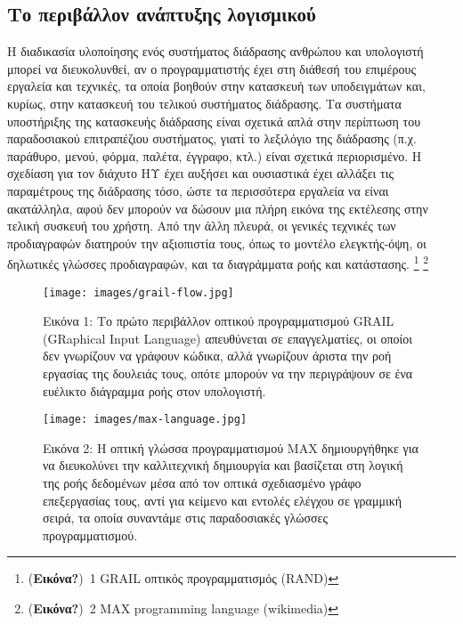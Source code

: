 \documentclass[
]{article}
\begin{document}
\hypertarget{ux3c4ux3bf-ux3c0ux3b5ux3c1ux3b9ux3b2ux3acux3bbux3bbux3bfux3bd-ux3b1ux3bdux3acux3c0ux3c4ux3c5ux3beux3b7ux3c2-ux3bbux3bfux3b3ux3b9ux3c3ux3bcux3b9ux3baux3bfux3cd}{%
\subsection{Το περιβάλλον ανάπτυξης
λογισμικού}\label{ux3c4ux3bf-ux3c0ux3b5ux3c1ux3b9ux3b2ux3acux3bbux3bbux3bfux3bd-ux3b1ux3bdux3acux3c0ux3c4ux3c5ux3beux3b7ux3c2-ux3bbux3bfux3b3ux3b9ux3c3ux3bcux3b9ux3baux3bfux3cd}}

Η διαδικασία υλοποίησης ενός συστήματος διάδρασης ανθρώπου και
υπολογιστή μπορεί να διευκολυνθεί, αν ο προγραμματιστής έχει στη διάθεσή
του επιμέρους εργαλεία και τεχνικές, τα οποία βοηθούν στην κατασκευή των
υποδειγμάτων και, κυρίως, στην κατασκευή του τελικού συστήματος
διάδρασης. Τα συστήματα υποστήριξης της κατασκευής διάδρασης είναι
σχετικά απλά στην περίπτωση του παραδοσιακού επιτραπέζιου συστήματος,
γιατί το λεξιλόγιο της διάδρασης (π.χ. παράθυρο, μενού, φόρμα, παλέτα,
έγγραφο, κτλ.) είναι σχετικά περιορισμένο. Η σχεδίαση για τον διάχυτο ΗΥ
έχει αυξήσει και ουσιαστικά έχει αλλάξει τις παραμέτρους της διάδρασης
τόσο, ώστε τα περισσότερα εργαλεία να είναι ακατάλληλα, αφού δεν μπορούν
να δώσουν μια πλήρη εικόνα της εκτέλεσης στην τελική συσκευή του χρήστη.
Από την άλλη πλευρά, οι γενικές τεχνικές των προδιαγραφών διατηρούν την
αξιοπιστία τους, όπως το μοντέλο ελεγκτής-όψη, οι δηλωτικές γλώσσες
προδιαγραφών, και τα διαγράμματα ροής και κατάστασης. \footnote{(\textbf{Εικόνα?})~1
  GRAIL οπτικός προγραμματισμός (RAND)} \footnote{(\textbf{Εικόνα?})~2
  MAX programming language (wikimedia)}

\leavevmode{}%
\begin{figure}
\hypertarget{fig:grail-flow}{%
\centering
\texttt{[image: images/grail-flow.jpg]}
\caption{Εικόνα 1: Το πρώτο περιβάλλον οπτικού προγραμματισμού GRAIL
(GRaphical Input Language) απευθύνεται σε επαγγελματίες, οι οποίοι δεν
γνωρίζουν να γράφουν κώδικα, αλλά γνωρίζουν άριστα την ροή εργασίας της
δουλειάς τους, οπότε μπορούν να την περιγράψουν σε ένα ευέλικτο
διάγραμμα ροής στον υπολογιστή.}\label{fig:grail-flow}
}
\end{figure}

\leavevmode{}%
\begin{figure}
\hypertarget{fig:max-language}{%
\centering
\texttt{[image: images/max-language.jpg]}
\caption{Εικόνα 2: Η οπτική γλώσσα προγραμματισμού MAX δημιουργήθηκε για
να διευκολύνει την καλλιτεχνική δημιουργία και βασίζεται στη λογική της
ροής δεδομένων μέσα από τον οπτικά σχεδιασμένο γράφο επεξεργασίας τους,
αντί για κείμενο και εντολές ελέγχου σε γραμμική σειρά, τα οποία
συναντάμε στις παραδοσιακές γλώσσες
προγραμματισμού.}\label{fig:max-language}
}
\end{figure}
\end{document}
